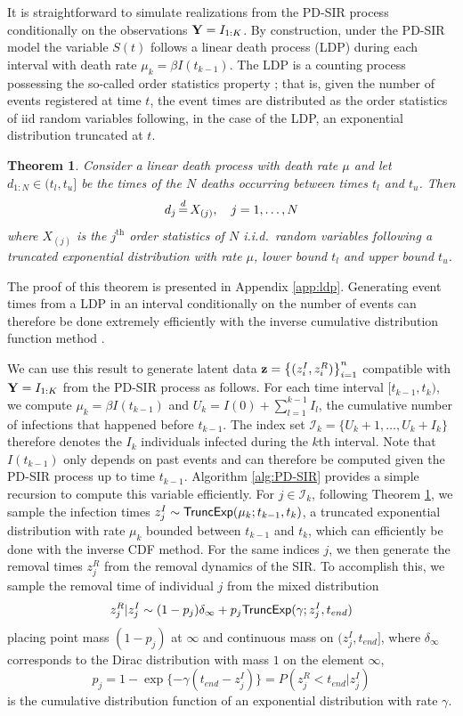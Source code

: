 \documentclass[11pt]{article}
\newcommand{\ram}[1]{{\color{green}{ #1}}}
\newtheorem{theorem}{Theorem}[section]
\begin{document}
	It is straightforward to simulate realizations from the PD-SIR process conditionally on the observations $\mathbf{Y} = I_{1:K}$. By construction, under the PD-SIR model the variable $S(t)$ follows a linear death process (LDP) during each interval with death rate $\mu_k = \beta I(t_{k-1})$. 
	The LDP is a counting process possessing the so-called order statistics property \cite{Neuts.1971}; that is, given the number of events registered at time $t$, the event times are distributed as the order statistics of iid random variables following, in the case of the LDP, an exponential distribution truncated at $t$.
	\begin{theorem}
		\label{theo:ldp}
		Consider a linear death process with death rate $\mu$ and let $d_{1:N} \in (t_l, t_u]$ be the times of the $N$ deaths occurring between times $t_l$ and $t_u$. Then 
		$$d_j \,{\buildrel d \over =}\, X_{(j)}, \quad j = 1, \dots, N$$
		where $X_{(j)}$ is the $j^{\text{th}}$ order statistics of $N$ i.i.d.\ random variables following a truncated exponential distribution with rate $\mu$, lower bound $t_l$ and upper bound $t_u$.
	\end{theorem}
	The proof of this theorem is presented in Appendix \ref{app:ldp}. Generating event times from a LDP in an interval conditionally on the number of events can therefore be done extremely efficiently with the inverse cumulative distribution function method \ram{ref Devroye 1986}. 
	
	We can use this result to generate latent data  $\mathbf{z} = \left\lbrace (z^I_i, z^R_i)\right\rbrace_{i=1}^{n}$ compatible with $\mathbf{Y} = I_{1:K}$ from the PD-SIR process as follows. For each time interval $[t_{k-1}, t_k)$, we compute $\mu_k = \beta I(t_{k-1})$ and $U_k = I(0) + \sum_{l=1}^{k-1} I_l$, the cumulative number of infections that happened before $t_{k-1}$. The index set $\mathcal{I}_k = \{U_k + 1, \dots, U_k + I_k\}$ therefore denotes the $I_k$ individuals infected during the $k$th interval. Note that $I(t_{k-1})$ only depends on past events and can therefore be computed given the PD-SIR process up to time $t_{k-1}$. Algorithm \ref{alg:PD-SIR} provides a simple recursion to compute this variable efficiently. For $j \in \mathcal{I}_k$, following Theorem \ref{theo:ldp}, we sample the infection times $z^I_j \sim \textsf{TruncExp}(\mu_k; t_{k-1}, t_k)$, a truncated exponential distribution with rate $\mu_k$ bounded between $t_{k-1}$ and $t_k$, which can efficiently be done with the inverse CDF method. For the same indices $j$, we then generate the removal times $z^R_j$ from the removal dynamics of the SIR. To accomplish this, we sample the removal time of individual $j$ from the mixed distribution
	$$z^R_j|z^I_j \sim (1 - p_j) \delta_{\infty} + p_j \textsf{TruncExp}(\gamma; z^I_j, t_{end})$$
	placing point mass $(1 - p_j)$ at $\infty$ and continuous mass on $(z^I_j, t_{end}]$,
	where $\delta_{\infty}$ corresponds to the Dirac distribution with mass $1$ on the element $\infty$,
	$$p_j = 1 - \exp\{-\gamma (t_{end} - z^I_j)\} = P(z^R_j < t_{end} | z^I_j)$$
	is the cumulative distribution function of an exponential distribution with rate $\gamma$. %
	
\end{document}
